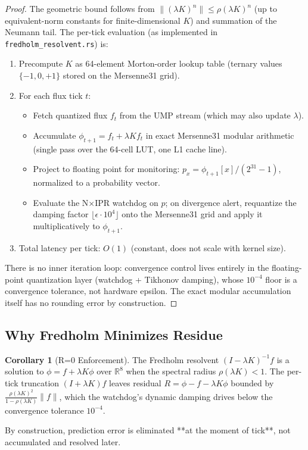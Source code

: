 \documentclass[11pt,oneside]{article}
\theoremstyle{definition}
\newtheorem{corollary}[theorem]{Corollary}
\begin{document}
\begin{proof}
The geometric bound follows from $\|(\lambda K)^n\| \leq \rho(\lambda K)^n$ (up to equivalent-norm constants for finite-dimensional $K$) and summation of the Neumann tail. The per-tick evaluation (as implemented in \texttt{fredholm\_resolvent.rs}) is:
\begin{enumerate}
  \item Precompute $K$ as 64-element Morton-order lookup table (ternary values $\{-1, 0, +1\}$ stored on the Mersenne31 grid).
  \item For each flux tick $t$:
  \begin{itemize}
    \item Fetch quantized flux $f_t$ from the UMP stream (which may also update $\lambda$).
    \item Accumulate $\phi_{t+1} = f_t + \lambda K f_t$ in exact Mersenne31 modular arithmetic (single pass over the 64-cell LUT, one L1 cache line).
    \item Project to floating point for monitoring: $p_x = \phi_{t+1}[x] / (2^{31}-1)$, normalized to a probability vector.
    \item Evaluate the N\ensuremath{\times}IPR watchdog on $p$; on divergence alert, requantize the damping factor $\lfloor \epsilon \cdot 10^4 \rfloor$ onto the Mersenne31 grid and apply it multiplicatively to $\phi_{t+1}$.
  \end{itemize}
  \item Total latency per tick: $O(1)$ (constant, does not scale with kernel size).
\end{enumerate}
There is no inner iteration loop: convergence control lives entirely in the floating-point quantization layer (watchdog + Tikhonov damping), whose $10^{-4}$ floor is a convergence tolerance, not hardware epsilon. The exact modular accumulation itself has no rounding error by construction.
\end{proof}

\subsection{Why Fredholm Minimizes Residue}

\begin{corollary}[R=0 Enforcement]
The Fredholm resolvent $(I - \lambda K)^{-1} f$ is a solution to $\phi = f + \lambda K\phi$ over $\mathbb{R}^8$ when the spectral radius $\rho(\lambda K) < 1$. The per-tick truncation $(I + \lambda K)f$ leaves residual $R = \phi - f - \lambda K\phi$ bounded by $\frac{\rho(\lambda K)^2}{1 - \rho(\lambda K)}\|f\|$, which the watchdog's dynamic damping drives below the convergence tolerance $10^{-4}$.

By construction, prediction error is eliminated **at the moment of tick**, not accumulated and resolved later.
\end{corollary}
\end{document}
